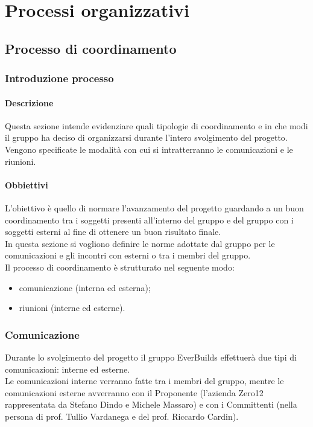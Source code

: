 \section{Processi organizzativi}
    \subsection{Processo di coordinamento}
        \subsubsection{Introduzione processo}
            \paragraph{Descrizione}
                Questa sezione intende evidenziare quali tipologie di coordinamento e in che modi il gruppo ha deciso di organizzarsi durante l’intero svolgimento del progetto.\\ 
                Vengono specificate le modalità con cui si intratterranno le comunicazioni e le riunioni.\\
            \paragraph{Obbiettivi}
                L’obiettivo è quello di normare l’avanzamento del progetto guardando a un buon coordinamento tra i soggetti presenti all’interno del gruppo e del gruppo con i soggetti esterni al fine di ottenere un buon risultato finale.\\ 
                In questa sezione si vogliono definire le norme adottate dal gruppo per le comunicazioni e gli incontri con esterni o tra i membri del gruppo.\\
                Il processo di coordinamento è strutturato nel seguente modo:\\
                \begin{itemize}
                    \item comunicazione (interna ed esterna);
                    \item riunioni (interne ed esterne).
                \end{itemize}
        \subsubsection{Comunicazione}
            Durante lo svolgimento del progetto il gruppo EverBuilds effettuerà due tipi di comunicazioni: interne ed esterne. \\
            Le comunicazioni interne verranno fatte tra i membri del gruppo, mentre le comunicazioni esterne avverranno con il Proponente (l’azienda Zero12 rappresentata da Stefano Dindo e Michele Massaro) e con i Committenti (nella persona di prof. Tullio Vardanega e del prof. Riccardo Cardin).\\
